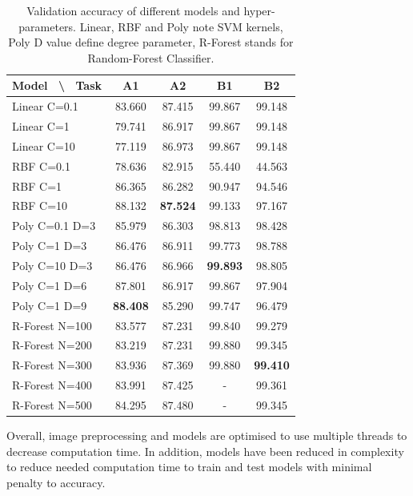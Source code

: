\documentclass{article}
\begin{document}
\begin{table}[h!]
	\begin{center}
		\begin{tabular}{l|c|c|c|c} 
		\textbf{Model  ~\textbackslash ~ Task}	& \textbf{A1} & \textbf{A2} & \textbf{B1} & \textbf{B2}\\
			\hline
Linear C=0.1    & 83.660 & 87.415 & 99.867 & 99.148 \\
Linear C=1      & 79.741 & 86.917 & 99.867 & 99.148 \\
Linear C=10     & 77.119 & 86.973 & 99.867 & 99.148 \\
RBF C=0.1       & 78.636 & 82.915 & 55.440 & 44.563 \\
RBF C=1         & 86.365 & 86.282 & 90.947 & 94.546 \\
RBF C=10        & 88.132 & \textbf{87.524} & 99.133 & 97.167 \\
Poly C=0.1 D=3  & 85.979 & 86.303 & 98.813 & 98.428 \\
Poly C=1 D=3    & 86.476 & 86.911 & 99.773 & 98.788 \\
Poly C=10 D=3   & 86.476 & 86.966 & \textbf{99.893} & 98.805 \\
Poly C=1 D=6    & 87.801 & 86.917 & 99.867 & 97.904 \\
Poly C=1 D=9    & \textbf{88.408} & 85.290 & 99.747 & 96.479 \\
R-Forest N=100  & 83.577 & 87.231 & 99.840 & 99.279 \\
R-Forest N=200  & 83.219 & 87.231 & 99.880 & 99.345 \\		
R-Forest N=300  & 83.936 & 87.369 & 99.880 & \textbf{99.410} \\		
R-Forest N=400  & 83.991 & 87.425 & - & 99.361 \\
R-Forest N=500  & 84.295 & 87.480 & - & 99.345 \\
		\end{tabular}
		\caption{Validation accuracy of different models and hyper-parameters. Linear, RBF and Poly note SVM kernels, Poly D value define degree parameter, R-Forest stands for Random-Forest Classifier.}
		\label{tab:validation}
	\end{center}
\end{table}

Overall, image preprocessing and models are optimised to use multiple threads to decrease computation time. In addition, models have been reduced in complexity to reduce needed computation time to train and test models with minimal penalty to accuracy. 
\end{document}

